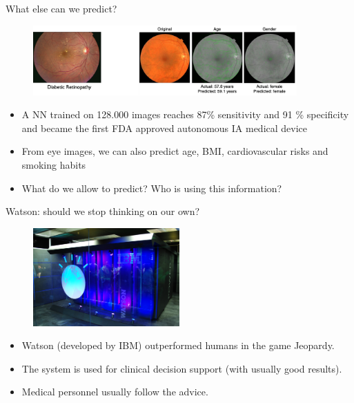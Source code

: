 \documentclass[xcolor=pdftex,dvipsnames,table]{beamer}
\begin{document}
\begin{frame}{What else can we predict?}
\begin{figure}[htb]
\includegraphics[width=0.9\textwidth]{../graphics/retinopathy.pdf}
\end{figure}
\begin{itemize}
\item<1-> A NN trained on 128.000 images reaches 87\% sensitivity and 91 \% specificity and became the first FDA approved autonomous IA medical device \cite{Abramoff2018}
\item<2-> From eye images, we can also predict age, BMI, cardiovascular risks and smoking habits \cite{Poplin2018}
\item<3-> What do we allow to predict? Who is using this information?
\end{itemize}
\end{frame}

\begin{frame}{Watson: should we stop thinking on our own?}
\begin{figure}[htb]
\includegraphics[width=0.5\textwidth]{../graphics/watson.pdf}
\end{figure}
\begin{itemize}
\item<1-> Watson (developed by IBM) outperformed humans in the game Jeopardy. 
\item<2-> The system is used for clinical decision support (with usually good results).  
\item<3-> Medical personnel usually follow the advice. 
\end{itemize}
\end{frame}
\end{document}
